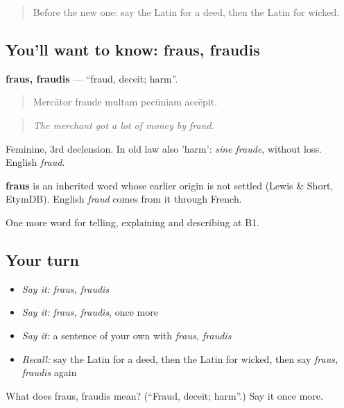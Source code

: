 \begin{quote}
Before the new one: say the Latin for a deed, then the Latin for wicked.
\end{quote}

\subsection*{You'll want to know: fraus, fraudis}
\textbf{fraus, fraudis} — \textquotedblleft{}fraud, deceit; harm\textquotedblright{}.

\begin{quote}
Mercātor fraude multam pecūniam accēpit.
\end{quote}

\begin{quote}
\emph{The merchant got a lot of money by fraud.}
\end{quote}

Feminine, 3rd declension. In old law also 'harm': \emph{sine fraude}, without loss. English \emph{fraud}.

\begin{cousinweb}
\textbf{fraus} is an inherited word whose earlier origin is not settled (Lewis \& Short, EtymDB). English \emph{fraud} comes from it through French.
\end{cousinweb}

\begin{grammarlens}[title={What you've built}]
One more word for telling, explaining and describing at B1.
\end{grammarlens}

\subsection*{Your turn}
\begin{itemize}
\raggedright
  \item \emph{Say it:} \emph{fraus, fraudis}
  \item \emph{Say it:} \emph{fraus, fraudis}, once more
  \item \emph{Say it:} a sentence of your own with \emph{fraus, fraudis}
  \item \emph{Recall:} say the Latin for a deed, then the Latin for wicked, then say \emph{fraus, fraudis} again
\end{itemize}

\begin{tcolorbox}[breakable,colback=teal!4,colframe=teal!35!black,title={Before you move on}]
What does fraus, fraudis mean? (\textquotedblleft{}Fraud, deceit; harm\textquotedblright{}.) Say it once more.
\end{tcolorbox}

